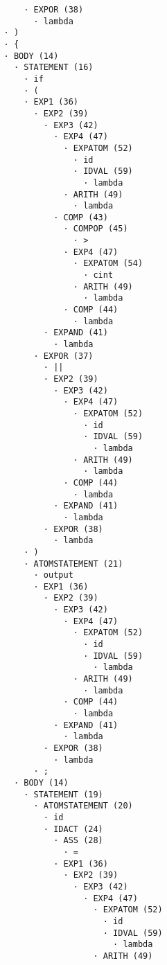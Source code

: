 \begin{enumerate}
\begin{tcolorbox}[title={Árbol sintáctico}, colback=white, breakable]
\begin{lstlisting}
              · EXPOR (38)
                · lambda
          · )
          · {
          · BODY (14)
            · STATEMENT (16)
              · if
              · (
              · EXP1 (36)
                · EXP2 (39)
                  · EXP3 (42)
                    · EXP4 (47)
                      · EXPATOM (52)
                        · id
                        · IDVAL (59)
                          · lambda
                      · ARITH (49)
                        · lambda
                    · COMP (43)
                      · COMPOP (45)
                        · >
                      · EXP4 (47)
                        · EXPATOM (54)
                          · cint
                        · ARITH (49)
                          · lambda
                      · COMP (44)
                        · lambda
                  · EXPAND (41)
                    · lambda
                · EXPOR (37)
                  · ||
                  · EXP2 (39)
                    · EXP3 (42)
                      · EXP4 (47)
                        · EXPATOM (52)
                          · id
                          · IDVAL (59)
                            · lambda
                        · ARITH (49)
                          · lambda
                      · COMP (44)
                        · lambda
                    · EXPAND (41)
                      · lambda
                  · EXPOR (38)
                    · lambda
              · )
              · ATOMSTATEMENT (21)
                · output
                · EXP1 (36)
                  · EXP2 (39)
                    · EXP3 (42)
                      · EXP4 (47)
                        · EXPATOM (52)
                          · id
                          · IDVAL (59)
                            · lambda
                        · ARITH (49)
                          · lambda
                      · COMP (44)
                        · lambda
                    · EXPAND (41)
                      · lambda
                  · EXPOR (38)
                    · lambda
                · ;
            · BODY (14)
              · STATEMENT (19)
                · ATOMSTATEMENT (20)
                  · id
                  · IDACT (24)
                    · ASS (28)
                      · =
                    · EXP1 (36)
                      · EXP2 (39)
                        · EXP3 (42)
                          · EXP4 (47)
                            · EXPATOM (52)
                              · id
                              · IDVAL (59)
                                · lambda
                            · ARITH (49)

\end{lstlisting}
\end{tcolorbox}
\end{enumerate}
